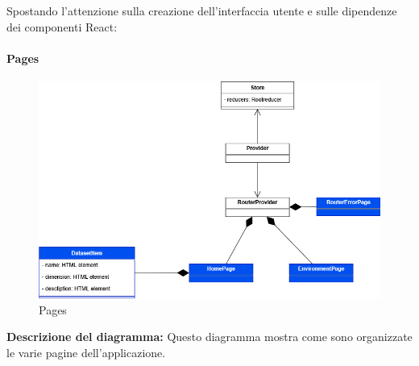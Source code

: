Spostando l'attenzione sulla creazione dell'interfaccia utente e sulle dipendenze dei componenti React:

\paragraph{Pages}
\begin{figure}[h!] \centering
    \includegraphics[scale=0.45]{template/images/uml_front/ui/pages.png}
    \caption{Pages}
\end{figure}
\textbf{Descrizione del diagramma:}
Questo diagramma mostra come sono organizzate le varie pagine dell'applicazione.
